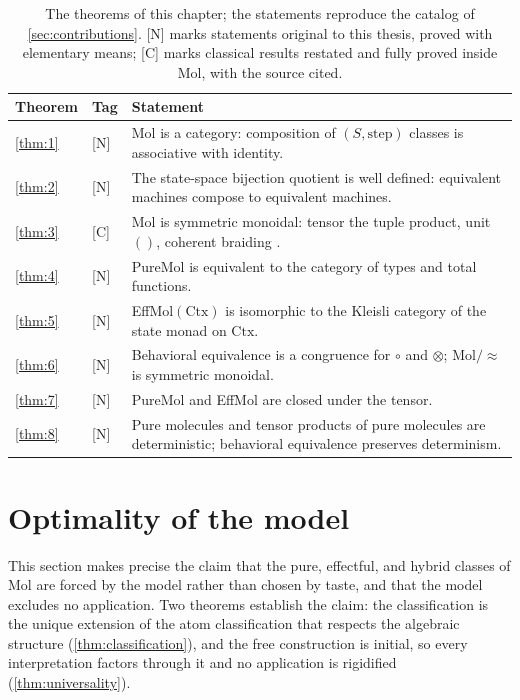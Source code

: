 \begin{table}[htbp]
\centering
\small
\begin{tabular}{@{}llp{9.3cm}@{}}
\toprule
Theorem & Tag & Statement \\
\midrule
\ref{thm:1} & [N] & Mol is a category: composition of $(S, \mathrm{step})$ classes is associative with identity. \\
\ref{thm:2} & [N] & The state-space bijection quotient is well defined: equivalent machines compose to equivalent machines. \\
\ref{thm:3} & [C] & Mol is symmetric monoidal: tensor the tuple product, unit $()$, coherent braiding \citep{maclane}. \\
\ref{thm:4} & [N] & PureMol is equivalent to the category of types and total functions. \\
\ref{thm:5} & [N] & EffMol$(\mathrm{Ctx})$ is isomorphic to the Kleisli category of the state monad on $\mathrm{Ctx}$. \\
\ref{thm:6} & [N] & Behavioral equivalence is a congruence for $\circ$ and $\otimes$; Mol$/{\approx}$ is symmetric monoidal. \\
\ref{thm:7} & [N] & PureMol and EffMol are closed under the tensor. \\
\ref{thm:8} & [N] & Pure molecules and tensor products of pure molecules are deterministic; behavioral equivalence preserves determinism. \\
\bottomrule
\end{tabular}
\caption{The theorems of this chapter; the statements reproduce the catalog of \autoref{sec:contributions}. [N] marks statements original to this thesis, proved with elementary means; [C] marks classical results restated and fully proved inside Mol, with the source cited.}
\end{table}

\section{Optimality of the model}\label{sec:mol-optimality}

This section makes precise the claim that the pure, effectful, and
hybrid classes of Mol are forced by the model rather than chosen by
taste, and that the model excludes no application. Two theorems
establish the claim: the classification is the unique extension of the
atom classification that respects the algebraic structure
(\autoref{thm:classification}), and the free construction is initial,
so every interpretation factors through it and no application is
rigidified (\autoref{thm:universality}).

